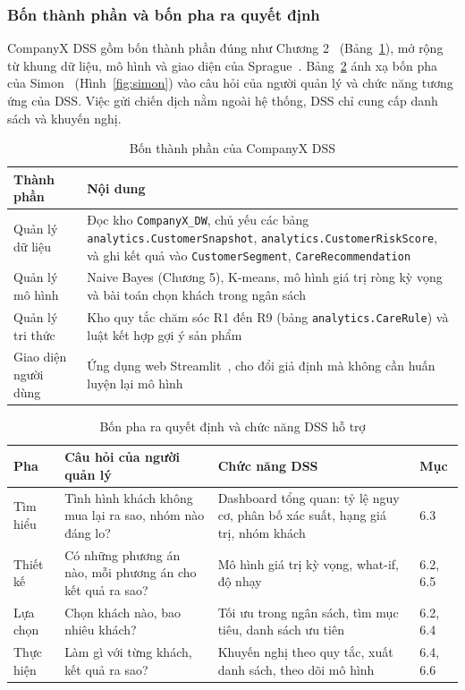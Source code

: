 \subsubsection{Bốn thành phần và bốn pha ra quyết định}
CompanyX DSS gồm bốn thành phần đúng như Chương 2~\cite{tlmh,turban2011} (Bảng~\ref{tab:thanhphan}), mở rộng từ khung dữ liệu, mô hình và giao diện của Sprague~\cite{sprague1980}. Bảng~\ref{tab:quytrinh} ánh xạ bốn pha của Simon~\cite{simon1977,turban2011} (Hình~\ref{fig:simon}) vào câu hỏi của người quản lý và chức năng tương ứng của DSS. Việc gửi chiến dịch nằm ngoài hệ thống, DSS chỉ cung cấp danh sách và khuyến nghị.

\begin{table}[!htbp]
\centering
\caption{Bốn thành phần của CompanyX DSS}
\label{tab:thanhphan}
\footnotesize
\begin{tabular}{p{2.8cm}p{11.6cm}}
\toprule
Thành phần & Nội dung \\
\midrule
Quản lý dữ liệu & Đọc kho \texttt{CompanyX\_DW}, chủ yếu các bảng \texttt{analytics.\allowbreak CustomerSnapshot}, \texttt{analytics.\allowbreak CustomerRiskScore}, và ghi kết quả vào \texttt{CustomerSegment}, \texttt{CareRecommendation} \\
Quản lý mô hình & Naive Bayes (Chương 5), K-means, mô hình giá trị ròng kỳ vọng và bài toán chọn khách trong ngân sách \\
Quản lý tri thức & Kho quy tắc chăm sóc R1 đến R9 (bảng \texttt{analytics.\allowbreak CareRule}) và luật kết hợp gợi ý sản phẩm \\
Giao diện người dùng & Ứng dụng web Streamlit~\cite{streamlit}, cho đổi giả định mà không cần huấn luyện lại mô hình \\
\bottomrule
\end{tabular}
\end{table}

\begin{table}[!htbp]
\centering
\caption{Bốn pha ra quyết định và chức năng DSS hỗ trợ}
\label{tab:quytrinh}
\footnotesize
\begin{tabular}{p{1.9cm}p{3.9cm}p{5.8cm}p{2.2cm}}
\toprule
Pha & Câu hỏi của người quản lý & Chức năng DSS & Mục \\
\midrule
Tìm hiểu & Tình hình khách không mua lại ra sao, nhóm nào đáng lo? & Dashboard tổng quan: tỷ lệ nguy cơ, phân bố xác suất, hạng giá trị, nhóm khách & 6.3 \\
Thiết kế & Có những phương án nào, mỗi phương án cho kết quả ra sao? & Mô hình giá trị kỳ vọng, what-if, độ nhạy & 6.2, 6.5 \\
Lựa chọn & Chọn khách nào, bao nhiêu khách? & Tối ưu trong ngân sách, tìm mục tiêu, danh sách ưu tiên & 6.2, 6.4 \\
Thực hiện & Làm gì với từng khách, kết quả ra sao? & Khuyến nghị theo quy tắc, xuất danh sách, theo dõi mô hình & 6.4, 6.6 \\
\bottomrule
\end{tabular}
\end{table}

